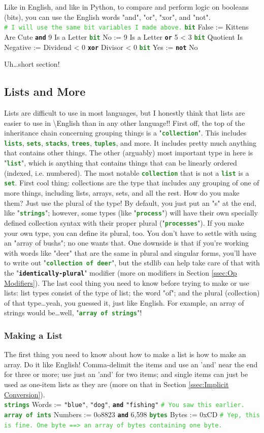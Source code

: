 \documentclass{article}
\newcommand{\English}{\textbackslash{}English}				%
\newcommand{\ssecl}[1]{\subsection{#1}\label{ssec:#1}}
\newcommand{\sssecl}[1]{\subsubsection{#1}\label{sssec:#1}}
\newcommand{\codecomment}[1]{\texttt{\textcolor{LimeGreen}{#1}}}
\newcommand{\commentline}[1]{\codecomment{\# #1}}
\newcommand{\type}[1]{\texttt{\textcolor{ForestGreen}{\textbf{#1}}}}
\newcommand{\common}[1]{\texttt{\textcolor{Mulberry}{\textbf{#1}}}}
\newcommand{\codestring}[1]{\texttt{\textcolor{NavyBlue}{"#1"}}}
\newenvironment{code}[0]
{\ttfamily{}				%
\setlength\parindent{0cm}	%
~\\}
{\setlength\parindent{1cm}
~\\}
\begin{document}
\indent Like in English, and like in Python, to compare and perform logic on booleans (bits), you can use the English words "and", "or", "xor", and "not".
\begin{code}
\commentline{I will use the same bit variables I made above.}
\type{bit} False := Kittens Are Cute \common{and} 9 Is a Letter
\type{bit} No := 9 Is a Letter \common{or} 5 < 3
\type{bit} Quotient Is Negative := Dividend < 0 \common{xor} Divisor < 0
\type{bit} Yes := \common{not} No
\end{code}

\indent Uh\ldots short section!

\ssecl{Lists and More}
\indent Lists are difficult to use in most languages, but I honestly think that lists are easier to use in \English{} than in any other language!!
\indent First off, the top of the inheritance chain concerning grouping things is a "\type{collection}". This includes \type{lists}, \type{sets}, \type{stacks}, \type{trees}, \type{tuples}, and more. It includes pretty much anything that contains other things. The other (arguably) most important type in here is "\type{list}", which is anything that contains things that can be linearly ordered (indexed, i.e. numbered). The most notable \type{collection} that is not a \type{list} is a \type{set}.
\indent First cool thing: collections are the type that includes any grouping of one of more things, including lists, arrays, sets, and all the rest. How do you make them? Just use the plural of the type! By default, you just put an "s" at the end, like "\type{strings}"; however, some types (like "\type{process}") will have their own specially defined collection syntax with their proper plural ("\type{processes}"). If you make your own type, you can define its plural, too. You don't have to settle with using an "array of bushs"; no one wants that. One downside is that if you're working with words like "deer" that are the same in plural and singular forms, you'll have to write out "\type{collection of deer}", but the stdlib can help take care of that with the "\common{identically-plural}" modifier (more on modifiers in Section \ref{ssec:Op Modifiers}).
\indent The last cool thing you need to know before trying to make or use lists: list types consist of the type of list; the word "of"; and the plural (collection) of that type\ldots yeah, you guessed it, just like English. For example, an array of strings would be\ldots well, "\type{array of strings}"!

\sssecl{Making a List}
\indent The first thing you need to know about how to make a list is how to make an array. Do it like English! Comma-delimit the items and use an 'and' near the end for three or more; use just an 'and' for two items; and single items can just be used as one-item lists as they are (more on that in Section \ref{ssec:Implicit Conversion}).
\begin{code}
\type{strings} Words := \codestring{blue}, \codestring{dog}, \common{and} \codestring{fishing} \commentline{You saw this earlier.}
\type{array of ints} Numbers := 0o8823 \common{and} 6,598
\type{bytes} Bytes := 0xCD \commentline{Yep, this is fine. One byte ==> an array of bytes containing one byte.}
\end{code}
\end{document}

